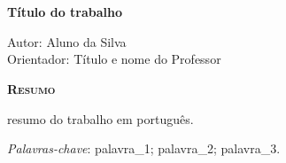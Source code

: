 \chapter*{}
\begin{center}
	{\Large{\textbf{Título do trabalho}}}
\end{center}

\vspace{1cm}

\begin{flushright}
	Autor: Aluno da Silva\\
	Orientador: Título e nome do Professor
\end{flushright}

\vspace{1cm}

\begin{center}
	\Large{\textsc{\textbf{Resumo}}}
\end{center}

\noindent 
resumo do trabalho em português.


\noindent\textit{Palavras-chave}: palavra\_1; palavra\_2; palavra\_3.





